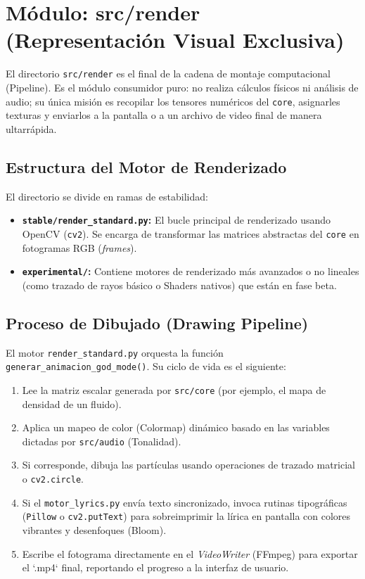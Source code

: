 \documentclass[12pt]{article}
\begin{document}
\section{Módulo: src/render (Representación Visual Exclusiva)}

El directorio \texttt{src/render} es el final de la cadena de montaje computacional (Pipeline). Es el módulo consumidor puro: no realiza cálculos físicos ni análisis de audio; su única misión es recopilar los tensores numéricos del \texttt{core}, asignarles texturas y enviarlos a la pantalla o a un archivo de video final de manera ultarrápida.

\subsection{Estructura del Motor de Renderizado}
El directorio se divide en ramas de estabilidad:
\begin{itemize}
    \item \textbf{\texttt{stable/render\_standard.py}:} El bucle principal de renderizado usando OpenCV (\texttt{cv2}). Se encarga de transformar las matrices abstractas del \texttt{core} en fotogramas RGB (\textit{frames}).
    \item \textbf{\texttt{experimental/}:} Contiene motores de renderizado más avanzados o no lineales (como trazado de rayos básico o Shaders nativos) que están en fase beta.
\end{itemize}

\subsection{Proceso de Dibujado (Drawing Pipeline)}
El motor \texttt{render\_standard.py} orquesta la función \texttt{generar\_animacion\_god\_mode()}. Su ciclo de vida es el siguiente:
\begin{enumerate}
    \item Lee la matriz escalar generada por \texttt{src/core} (por ejemplo, el mapa de densidad de un fluido).
    \item Aplica un mapeo de color (Colormap) dinámico basado en las variables dictadas por \texttt{src/audio} (Tonalidad).
    \item Si corresponde, dibuja las partículas usando operaciones de trazado matricial o \texttt{cv2.circle}.
    \item Si el \texttt{motor\_lyrics.py} envía texto sincronizado, invoca rutinas tipográficas (\texttt{Pillow} o \texttt{cv2.putText}) para sobreimprimir la lírica en pantalla con colores vibrantes y desenfoques (Bloom).
    \item Escribe el fotograma directamente en el \textit{VideoWriter} (FFmpeg) para exportar el `.mp4` final, reportando el progreso a la interfaz de usuario.
\end{enumerate}
\end{document}
